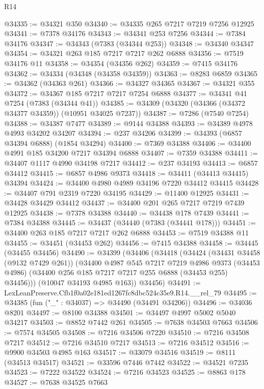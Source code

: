 \begin{lexlean}{R14}
\begin{coremodule}
@34335 := @34321 @350
@34340 := @34335 @265 @7217 @7219 @7256 @12925
@34341 := @7378 @34176
@34343 := @34341 @253 @7256
@34344 := @7384 @34176
@34347 := @34343 (@7383 (@34344 @253))
@34348 := @34340 @34347
@34354 := @34321 @263 @185 @7217 @7217 @262 @6888
@34356 := @7519 @34176 @11
@34358 := @34354 (@34356 @262)
@34359 := @7415 @34176
@34362 := @34334 (@34348 (@34358 @34359))
@34363 := @8283 @6859
@34365 := @34362 (@34363 @261)
@34366 := @34327 @34365
@34367 := @34321 @355
@34372 := @34367 @185 @7217 @7217 @7254 @6888
@34377 := @34341 @41 @7254 (@7383 (@34344 @41))
@34385 := @34309 (@34320 (@34366 (@34372 @34377 @34359)) (@10951 @34025 @7237))
@34387 := @7286 (@7540 @7254)
@34388 := @34387 @7477
@34389 := @9144 @34388
@34393 := @34389 @4978 @4993 @34202 @34207
@34394 := @237 @34206
@34399 := @34393 (@6857 @34394 @6888) (@1854 @34294)
@34400 := @7369 @34388
@34406 := @34400 @4991 @185 @34200 @7217 @34394 @6888
@34407 := @7359 @34388
@34411 := @34407 @1117 @4990 @34198 @7217
@34412 := @237 @34193
@34413 := @6857 @34412
@34415 := @6857 @4986 @9373
@34418 := @34411 (@34413 @34415) @34394
@34424 := @34400 @4980 @4989 @34196 @7220 @34412 @34415
@34428 := @34407 @791 @2319 @7220 @34195
@34429 := @11400 @12925
@34431 := @34428 @34429 @34412
@34437 := @34400 @201 @265 @7217 @7219 @7439 @12925
@34438 := @7378 @34388
@34440 := @34438 @178 @7439
@34441 := @7384 @34388
@34445 := @34437 (@34440 (@7383 (@34441 @178)))
@34451 := @34400 @263 @185 @7217 @7217 @262 @6888
@34453 := @7519 @34388 @11
@34455 := @34451 (@34453 @262)
@34456 := @7415 @34388
@34458 := @34445 (@34455 @34456)
@34490 := @34399
    (@34406
      (@34418
        (@34424
          (@34431 @34458 (@9132 @7429 @261))
          (@34400
            @4987
            @545
            @7217
            @7219
            @4986
            @9373
            (@34453 @4986)
            (@34400 @256 @185 @7217 @7217 @255 @6888 (@34453 @255) @34456)))
        (@10047 @34193 @4985 @163))
      @34456)
@34491 := LexLeanPreserve.Cfb1f0a02e181ed1267fc8dbc524c35e9.R14.__rel_79
@34495 := @34385 (fun ("_" : @34037) => @34490 (@34491 @34206))
@34496 := @34036 @8201
@34497 := @8100 @34388
@34501 := @34497 @4997 @5002 @5040 @34217
@34503 := @8852 @7442 @261
@34505 := @7638 @34503 @7663
@34506 := @7574 @34505
@34508 := @7216 @34506 @7220
@34510 := @7216 @34508 @7217
@34512 := @7216 @34510 @7217
@34513 := @7216 @34512
@34516 := @9900 @34503 @4985 @163
@34517 := @33079 @34516
@34519 := @8111 (@34513 @34517)
@34521 := @33596 @7446 @7442
@34522 := @34521 @7235
@34523 := @7222 @34522
@34524 := @7216 @34523
@34525 := @8863 @178
@34527 := @7638 @34525 @7663

\end{coremodule}
\end{lexlean}
